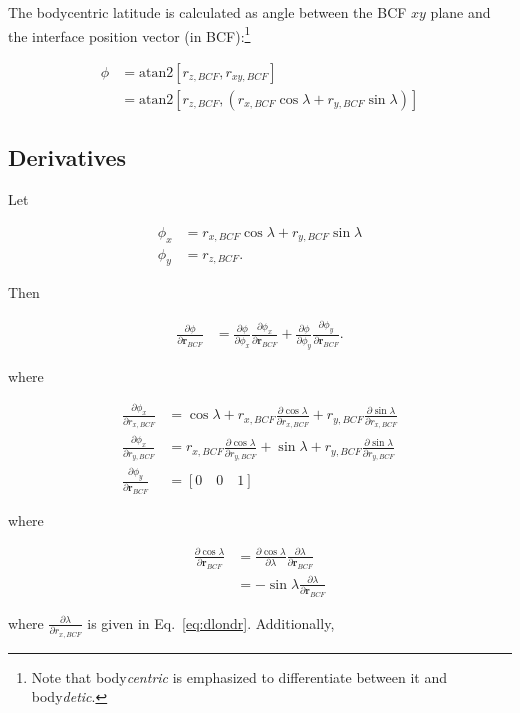 \documentclass[]{article}
\newcommand{\vb}[1]{\bm{#1}} %
\newcommand{\pd}[2]{\frac{\partial #1}{\partial #2}} %
\begin{document}

The bodycentric latitude is calculated as angle between the BCF $xy$ plane and the interface position vector (in BCF):\footnote{Note that body\emph{centric} is emphasized to differentiate between it and body\emph{detic}.}

\begin{align}
	\phi &= \mathrm{atan2} \left[ r_{z, BCF}, r_{xy, BCF} \right] \\
	&= \mathrm{atan2} \left[ r_{z, BCF}, \left( r_{x, BCF} \cos \lambda + r_{y, BCF} \sin \lambda \right) \right]
\end{align}

\subsection{Derivatives}

Let

\begin{align}
	\phi_x &= r_{x, BCF} \cos \lambda + r_{y, BCF} \sin \lambda \\
	\phi_y &= r_{z, BCF}.
\end{align}

Then

\begin{align}
	\pd{\phi}{\vb{r}_{BCF}} &= \pd{\phi}{\phi_x} \pd{\phi_x}{\vb{r}_{BCF}} + \pd{\phi}{\phi_y} \pd{\phi_y}{\vb{r}_{BCF}}.
\end{align}

where

\begin{align}
	\pd{\phi_x}{r_{x, BCF}} &= \cos \lambda + r_{x, BCF} \pd{\cos \lambda}{r_{x, BCF}} + r_{y, BCF} \pd{\sin \lambda}{r_{x, BCF}} \\
	\pd{\phi_x}{r_{y, BCF}} &= r_{x, BCF} \pd{\cos \lambda}{r_{y, BCF}} + \sin \lambda + r_{y, BCF} \pd{\sin \lambda}{r_{y, BCF}} \\
	\pd{\phi_y}{\vb{r}_{BCF}} &= \left[ 0 \quad 0 \quad 1 \right]
\end{align}

where

\begin{align}
	\pd{\cos \lambda}{\vb{r}_{BCF}} &= \pd{\cos \lambda}{\lambda} \pd{\lambda}{\vb{r}_{BCF}} \\
	&= -\sin \lambda \pd{\lambda}{\vb{r}_{BCF}}
\end{align}

where $\pd{\lambda}{r_{x, BCF}}$ is given in Eq.~\eqref{eq:dlondr}. Additionally,
\end{document}
